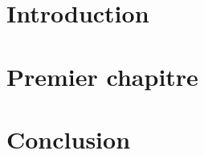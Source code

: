 \documentclass[twoside]{EPURapport}
\begin{document}
\chapter{Introduction}

\chapter{Premier chapitre}

\chapter{Conclusion}

\annexes
\end{document}
